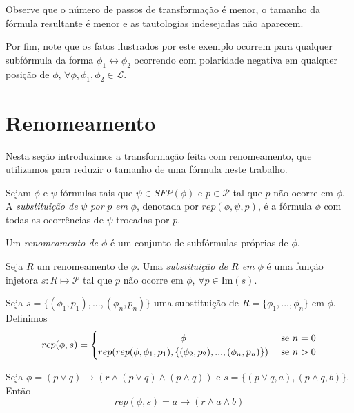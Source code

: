 \begin{example}
    Observe que o número de passos de transformação é menor, o tamanho da fórmula resultante é menor e as tautologias indesejadas não aparecem.
    
    Por fim, note que os fatos ilustrados por este exemplo ocorrem para qualquer subfórmula da forma $\phi_1 \leftrightarrow \phi_2$ ocorrendo com polaridade negativa em qualquer posição de $\phi$, $\forall \phi,\phi_1,\phi_2 \in \mathcal{L}$.
\end{example}

\section{Renomeamento}

\indent

Nesta seção introduzimos a transformação feita com renomeamento, que utilizamos para reduzir o tamanho de uma fórmula neste trabalho.

\begin{definition}
	Sejam $\phi$ e $\psi$ fórmulas tais que $\psi \in SFP(\phi)$ e $p \in \mathcal{P}$ tal que $p$ não ocorre em $\phi$. A \emph{substituição de} $\psi$ \emph{por} $p$ \emph{em} $\phi$, denotada por $rep(\phi,\psi,p)$, é a fórmula $\phi$ com todas as ocorrências de $\psi$ trocadas por $p$.
	
	Um \emph{renomeamento de $\phi$} é um conjunto de subfórmulas próprias de $\phi$.
	
	Seja $R$ um renomeamento de $\phi$. Uma \emph{substituição de $R$ em $\phi$} é uma função injetora $s : R \longmapsto \mathcal{P}$ tal que $p$ não ocorre em $\phi$, $\forall p \in \text{Im}(s)$.
	
	Seja $s = \{(\phi_1,p_1),...,(\phi_n,p_n) \}$ uma substituição de $R = \{\phi_1,...,\phi_n \}$ em $\phi$. Definimos
	\[
	rep(\phi,s) =
	\begin{cases} 
	\hfill \phi    \hfill & \text{ se $n=0$} \\
	\hfill rep(rep(\phi,\phi_1,p_1),\{(\phi_2,p_2),...,(\phi_n,p_n)\}) \hfill & \text{ se $n > 0$} \\
	\end{cases}
	\]
\end{definition}

\begin{example}
	Seja $\phi = (p \vee q) \rightarrow (r \wedge (p \vee q) \wedge (p \wedge q))$ e $s = \{(p \vee q,a),(p \wedge q,b)\}$. Então $$rep(\phi,s) = a \rightarrow (r \wedge a \wedge b)$$
\end{example}


